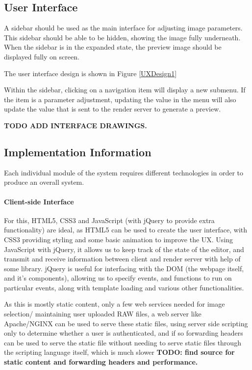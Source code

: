 \documentclass[12pt,a4paper]{article}
\begin{document}
\subsection{User Interface}\label{UserInterface}
  A sidebar should be used as the main interface for adjusting image parameters.
  This sidebar should be able to be hidden, showing the image fully underneath.
  When the sidebar is in the expanded state, the preview image should be displayed
  fully on screen.

  The user interface design is shown in Figure \ref{UXDesign1}

  Within the sidebar, clicking on a navigation item will display a new submenu.
  If the item is a parameter adjustment, updating the value in the menu will also
  update the value that is sent to the render server to generate a preview.

\textbf{TODO ADD INTERFACE DRAWINGS.}

\subsection{Implementation Information}
Each individual module of the system requires different technologies in order to
produce an overall system.

\paragraph{Client-side Interface}
For this, HTML5, CSS3 and JavaScript (with jQuery to provide extra functionality)
are ideal, as HTML5 can be used to create the user interface, with CSS3 providing styling
and some basic animation to improve the UX. Using JavaScript with jQuery, it allows us
to keep track of the state of the editor, and transmit and receive information between client and
render server with help of some library. jQuery is useful for interfacing with the
DOM (the webpage itself, and it's components), allowing us to specify events, and functions
to run on particular events, along with template loading and various other functionalities.

As this is mostly static content, only a few web services needed for image selection/
maintaining user uploaded RAW files, a web server like Apache/NGINX can be used to serve
these static files, using server side scripting only to determine whether a user is authenticated,
and if so forwarding headers can be used to serve the static file without needing to serve static files
through the scripting language itself, which is much slower
\textbf{TODO: find source for static content and forwarding headers and performance.}
\end{document}
